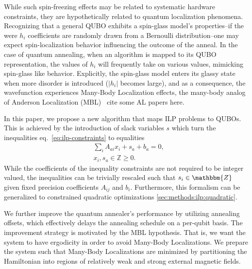 \documentclass[prd,twocolumn,tightenlines,preprintnumbers,showpacs,superscriptaddress,notitlepage,nofootinbib,eqsecnum,floatfix,longbibliography,aps,10pt]{revtex4-2}
\begin{document}
While such spin-freezing effects may be related to systematic hardware constraints, they are hypothetically related to quantum localization phenomena.
Recognizing that a general QUBO exhibits a spin-glass model's properties--if the were $h_i$ coefficients are randomly drawn from a Bernoulli distribution--one may expect spin-localization behavior influencing the outcome of the anneal.
In the case of quantum annealing, when an algorithm is mapped to its QUBO representation, the values of $h_i$ will frequently take on various values, mimicking spin-glass like behavior.
Explicitly, the spin-glass model enters its glassy state when more disorder is introduced ($|h_i|$ becomes large), and as a consequence, the wavefunction experiences Many-Body Localization effects, the many-body analog of Anderson Localization (MBL)~{\color{red} cite some AL papers here}.


In this paper, we propose a new algorithm that maps ILP problems to QUBOs.
This is achieved by the introduction of slack variables $s$ which turn the inequalities eq.~\eqref{eq:ilp-constraints} to equalities
\begin{align}
  \label{eq:ilp:slack}
  & \sum_i A_{a i}x_i + s_a + b_a = 0, \\
  & x_i, s_a \in \mathbb{Z} \geq 0.
\end{align}
While the coefficients of the inequality constraints are not required to be integer valued, the inequalities can be trivially rescaled such that $s_i \in \mathbbm{Z}$ given fixed precision coefficients $A_{ij}$ and $b_i$.
Furthermore, this formalism can be generalized to constrained quadratic optimizations \ref{sec:methods:ilp:quadratic}.

We further improve the quantum annealer's performance by utilizing annealing offsets, which effectively delays the annealing schedule on a per-qubit basis.
The improvement strategy is motivated by the MBL hypothesis.
That is, we want the system to have ergodicity in order to avoid Many-Body Localizations.
We prepare the system such that Many-Body Localizations are minimized by partitioning the Hamiltonian into regions of relatively weak and strong external magnetic fields.
\end{document}

